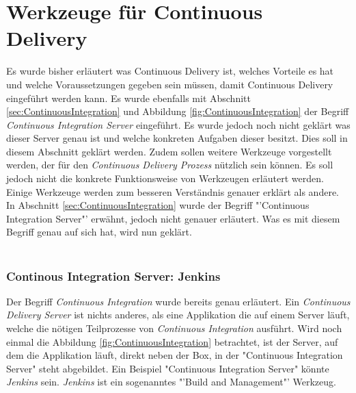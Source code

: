 \section{Werkzeuge für Continuous Delivery}
\label{sec:WerkzeugeCD}
Es wurde bisher erläutert was Continuous Delivery ist, welches Vorteile es hat und welche Voraussetzungen gegeben sein müssen, damit Continuous Delivery eingeführt werden kann. Es wurde ebenfalls mit Abschnitt \ref{sec:ContinuousIntegration}  und Abbildung \ref{fig:ContinuousIntegration}  der Begriff \textit{Continuous Integration Server} eingeführt. Es wurde jedoch noch nicht geklärt was dieser Server genau ist und welche konkreten Aufgaben dieser besitzt. Dies soll in diesem Abschnitt geklärt werden. Zudem sollen weitere Werkzeuge vorgestellt werden, der für den \textit{Continuous Delivery Prozess} nützlich sein können. Es soll jedoch nicht die konkrete Funktionsweise von Werkzeugen erläutert werden. Einige Werkzeuge werden zum besseren Verständnis genauer erklärt als andere.
In Abschnitt \ref{sec:ContinuousIntegration}  wurde der Begriff "'Continuous Integration Server"' erwähnt, jedoch nicht genauer erläutert. Was es mit diesem Begriff genau auf sich hat, wird nun geklärt. 
\\\\
\subsubsection*{Continous Integration Server: Jenkins}
Der Begriff \textit{Continuous Integration} wurde bereits genau erläutert. Ein \textit{Continuous Delivery Server} ist nichts anderes, als eine Applikation die auf einem Server läuft, welche die nötigen Teilprozesse von \textit{Continuous Integration} ausführt. Wird noch einmal die Abbildung \ref{fig:ContinuousIntegration}  betrachtet, ist der Server, auf dem die Applikation läuft, direkt neben der Box, in der "Continuous Integration Server" steht abgebildet. Ein Beispiel "Continuous Integration Server" könnte \textit{Jenkins} sein. \textit{Jenkins} ist ein sogenanntes "'Build and Management"' Werkzeug.

